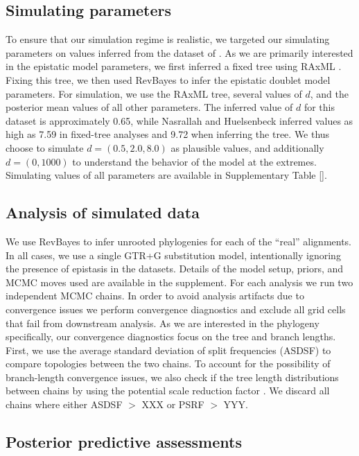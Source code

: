 \documentclass[11pt]{article}
\begin{document}
\subsection*{Simulating parameters\label{sec:tunicates}}
To ensure that our simulation regime is realistic, we targeted our simulating parameters on values inferred from the dataset of \cite{}.
As we are primarily interested in the epistatic model parameters, we first inferred a fixed tree using RAxML \citep{stamatakis2014raxml}.
Fixing this tree, we then used RevBayes to infer the epistatic doublet model parameters.
For simulation, we use the RAxML tree, several values of $d$, and the posterior mean values of all other parameters.
The inferred value of $d$ for this dataset is approximately 0.65, while Nasrallah and Huelsenbeck inferred values as high as 7.59 in fixed-tree analyses and 9.72 when inferring the tree.
We thus choose to simulate $d = (0.5,2.0,8.0)$ as plausible values, and additionally $d=(0,1000)$ to understand the behavior of the model at the extremes.
Simulating values of all parameters are available in Supplementary Table \ref{}.

\subsection*{Analysis of simulated data\label{sec:mcmc}}
We use RevBayes \citep{hohna2016revbayes} to infer unrooted phylogenies for each of the ``real'' alignments.
In all cases, we use a single GTR+G substitution model, intentionally ignoring the presence of epistasis in the datasets.
Details of the model setup, priors, and MCMC moves used are available in the supplement.
For each analysis we run two independent MCMC chains.
In order to avoid analysis artifacts due to convergence issues we perform convergence diagnostics and exclude all grid cells that fail from downstream analysis.
As we are interested in the phylogeny specifically, our convergence diagnostics focus on the tree and branch lengths.
First, we use the average standard deviation of split frequencies (ASDSF) to compare topologies between the two chains.
To account for the possibility of branch-length convergence issues, we also check if the tree length distributions between chains by using the potential scale reduction factor \citep[PSRF,\ ][]{brooks1998general}.
We discard all chains where either ASDSF $>$ XXX or PSRF $>$ YYY.

\subsection*{Posterior predictive assessments\label{sec:pps}}
\end{document}
